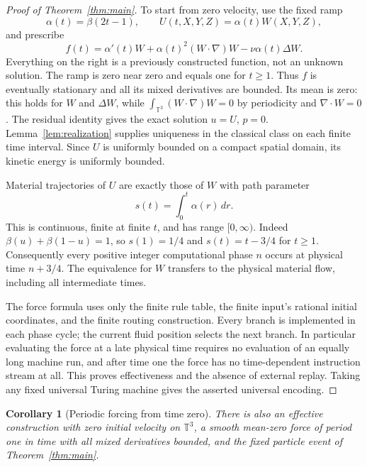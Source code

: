 \documentclass[11pt]{article}
\newtheorem{corollary}[theorem]{Corollary}
\theoremstyle{remark}\newtheorem{remark}[theorem]{Remark}
\begin{document}
\begin{proof}[Proof of Theorem~\ref{thm:main}]
To start from zero velocity, use the fixed ramp
\begin{equation}\label{eq:steady-ramp}
 \alpha(t)=\beta(2t-1),\qquad U(t,X,Y,Z)=\alpha(t)W(X,Y,Z),
\end{equation}
and prescribe
\begin{equation}\label{eq:steady-force}
 f(t)=\alpha'(t)W+\alpha(t)^2(W\cdot\nabla)W
          -\nu\alpha(t)\Delta W.
\end{equation}
Everything on the right is a previously constructed function, not an
unknown solution.  The ramp is zero near zero and equals one for
$t\ge1$.  Thus $f$ is eventually stationary and all its mixed
derivatives are bounded.  Its mean is zero: this holds for $W$ and
$\Delta W$, while
$\int_{\mathbb T^3}(W\cdot\nabla)W=0$ by periodicity and
$\nabla\cdot W=0$.  The residual identity gives the exact solution
$u=U$, $p=0$.  Lemma~\ref{lem:realization} supplies uniqueness in
the classical class on each finite time interval.
Since $U$ is uniformly bounded on a compact spatial domain, its
kinetic energy is uniformly bounded.

Material trajectories of $U$ are exactly those of $W$ with path
parameter
\[
 s(t)=\int_0^t\alpha(r)\,dr.
\]
This is continuous, finite at finite $t$, and has range $[0,\infty)$.
Indeed $\beta(u)+\beta(1-u)=1$, so $s(1)=1/4$ and
$s(t)=t-3/4$ for $t\ge1$.  Consequently every positive integer
computational phase $n$ occurs at physical time $n+3/4$.
The equivalence for $W$ transfers to the physical material flow,
including all intermediate times.

The force formula uses only the finite rule table, the finite input's
rational initial coordinates, and the finite routing construction.
Every branch is implemented in each phase cycle; the current fluid
position selects the next branch.  In particular evaluating the force
at a late physical time requires no evaluation of an equally long
machine run, and after time one the force has no time-dependent
instruction stream at all.  This proves effectiveness and the
absence of external replay.  Taking any fixed universal Turing
machine gives the asserted universal encoding.
\end{proof}

\begin{corollary}[Periodic forcing from time zero]\label{cor:periodic}
There is also an effective construction with zero initial velocity on
$\mathbb T^3$, a smooth mean-zero force of period one in time with
all mixed derivatives bounded, and the fixed particle event of
Theorem~\ref{thm:main}.
\end{corollary}
\end{document}
